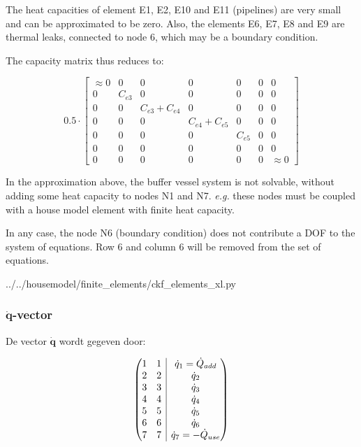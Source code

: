 The heat capacities of element E1, E2, E10 and E11 (pipelines) are very small and can be approximated to be zero. Also, the elements E6, E7, E8 and E9 are thermal leaks, connected to node 6, which may be a boundary condition.

The capacity matrix thus reduces to:

\[
0.5 \cdot 
\begin{bmatrix}
	\approx 0 & 0 & 0 & 0 & 0 & 0 & 0 \\
	0 & C_{e3} & 0 & 0 & 0 & 0 & 0 \\
	0 & 0 & C_{e3} + C_{e4} & 0 & 0 & 0 & 0 \\
	0 & 0 & 0 & C_{e4} + C_{e5} & 0 & 0 & 0 \\
	0 & 0 & 0 & 0 & C_{e5} & 0 & 0 \\
	0 & 0 & 0 & 0 & 0 & 0 & 0 \\
	0 & 0 & 0 & 0 & 0 & 0 & \approx 0
\end{bmatrix}
\]

In the approximation above, the buffer vessel system is not solvable, without adding some heat capacity to nodes N1 and N7. \emph{e.g.} these nodes must be coupled with a house model element with finite heat capacity.

In any case, the node N6 (boundary condition) does not contribute a DOF to the system of equations. Row 6 and column 6 will be removed from the set of equations.

 
{../../housemodel/finite\_elements/ckf\_elements\_xl.py}

\subsubsection{$\mathbf{\dot{q}}$-vector}

De vector $\mathbf{\dot{q}}$ wordt gegeven door:

\[
\left(\hspace{-5pt}\begin{array}{cc|c}
	1 & 1 & \dot{q}_1 = \dot{Q}_{add}\\
	2 & 2 & \dot{q}_2\\
	3 & 3 & \dot{q}_3\\
	4 & 4 & \dot{q}_4\\
	5 & 5 & \dot{q}_5\\
	6 & 6 & \dot{q}_6\\
	7 & 7 & \dot{q}_7 = -\dot{Q}_{use}
\end{array}\hspace{-5pt}\right)
\]

